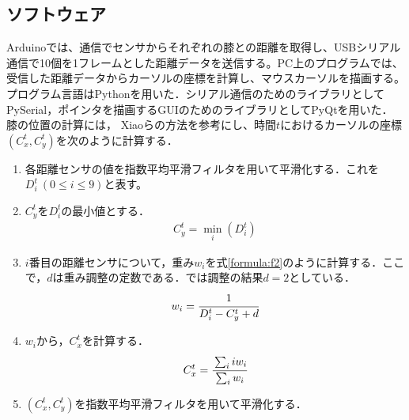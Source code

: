 \subsection{ソフトウェア} 
Arduinoでは、\iic 通信でセンサからそれぞれの膝との距離を取得し、USBシリアル通信で10個を1フレームとした距離データを送信する。PC上のプログラムでは、受信した距離データからカーソルの座標を計算し、マウスカーソルを描画する。プログラム言語はPythonを用いた．シリアル通信のためのライブラリとしてPySerial，ポインタを描画するGUIのためのライブラリとしてPyQtを用いた．
膝の位置の計算には，
Xiaoら\cite{Xiao:2018:LOP:3173574.3173669}の方法を参考にし、時間$t$におけるカーソルの座標$(C^t_x, C^t_y)$を次のように計算する．
\begin{enumerate}
	\item 各距離センサの値を指数平均平滑フィルタを用いて平滑化する．これを$D^t_i \ (0 \leq i \leq 9)$と表す。
	\item $C^t_y$を$D^t_i $の最小値とする．
		\begin{eqnarray}
		 	C^t_y = \min_i(D^t_i)
		 	\label{formula:f1}
		\end{eqnarray}
	\item $i$番目の距離センサについて，重み$w_i$を式\ref{formula:f2}のように計算する．ここで，$d$は重み調整の定数である．\SysName では調整の結果$d=2$としている．
		\begin{eqnarray}
			w_i = \cfrac{1}{D^t_i - C^t_y + d}
		\label{formula:f2}
	\end{eqnarray}
	\item $w_i$から，$C^t_x$を計算する．
		\begin{eqnarray}
		 	 C^t_x=\cfrac{\sum_i iw_i}{\sum_i w_i}
		 	\label{formula:f3}
		\end{eqnarray} 
	\item $(C^t_x, C^t_y)$を指数平均平滑フィルタを用いて平滑化する．
\end{enumerate}


